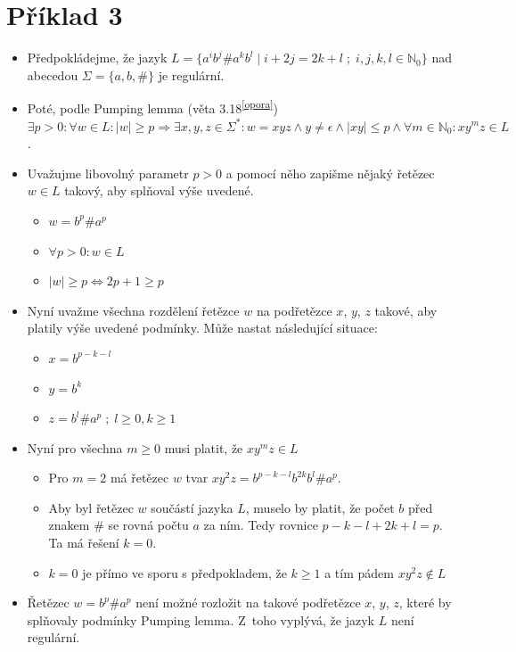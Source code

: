 \documentclass[11pt, a4paper, titlepage]{article}
\newcommand{\N}{\mathbb{N}_0}
\begin{document}
\section*{Příklad 3}

\begin{itemize}

    \item Předpokládejme, že jazyk $L=\{a^i b^j \# a^k b^l \mid i+2j=2k+l \;;\; i,j,k,l \in \N \}$ nad abecedou $\Sigma = \{a, b, \#\}$ je regulární.

    \item Poté, podle Pumping lemma (věta 3.18\textsuperscript{\ref{opora}}) $\exists p>0 : \forall w \in L : |w| \ge p \Rightarrow \exists x, y, z \in \Sigma^* : w=xyz \land y \ne \epsilon \land |xy| \le p \land \forall m \in \N : xy^mz \in L$.

    \item Uvažujme libovolný parametr $p>0$ a pomocí něho zapišme nějaký řetězec $w \in L$ takový, aby splňoval výše uvedené. \begin{itemize}[label=$\circ$]
        \item $w=b^p \# a^p$
        \item $\forall p>0 : w \in L$
        \item $|w| \ge p \Leftrightarrow 2p + 1 \ge p$
    \end{itemize}

    \item Nyní uvažme všechna rozdělení řetězce $w$ na podřetězce $x$, $y$, $z$ takové, aby platily výše uvedené podmínky. Může nastat následující situace: \begin{itemize}[label=$\circ$]
        \item $x = b^{p-k-l}$
        \item $y = b^k$
        \item $z = b^l \# a^p \;;\; l \ge 0, k \ge 1$
    \end{itemize}

    \item Nyní pro všechna $m \ge 0$ musi platit, že $xy^mz \in L$ \begin{itemize}[label=$\circ$]
        \item Pro $m = 2$ má řetězec $w$ tvar $xy^2z = b^{p-k-l} b^{2k} b^l \# a^p$.
        \item Aby byl řetězec $w$ součástí jazyka $L$, muselo by platit, že počet $b$ před znakem $\#$ se rovná počtu $a$ za ním. Tedy rovnice $p-k-l+2k+l=p$. Ta má řešení $k=0$.
        \item $k=0$ je přímo ve sporu s předpokladem, že $k \ge 1$ a tím pádem $xy^2z \notin L$
        \end{itemize}

    \item Řetězec $w=b^p \# a^p$ není možné rozložit na takové podřetězce $x$, $y$, $z$, které by splňovaly podmínky Pumping lemma. Z~toho vyplývá, že jazyk $L$ není regulární.

\end{itemize}
\end{document}

